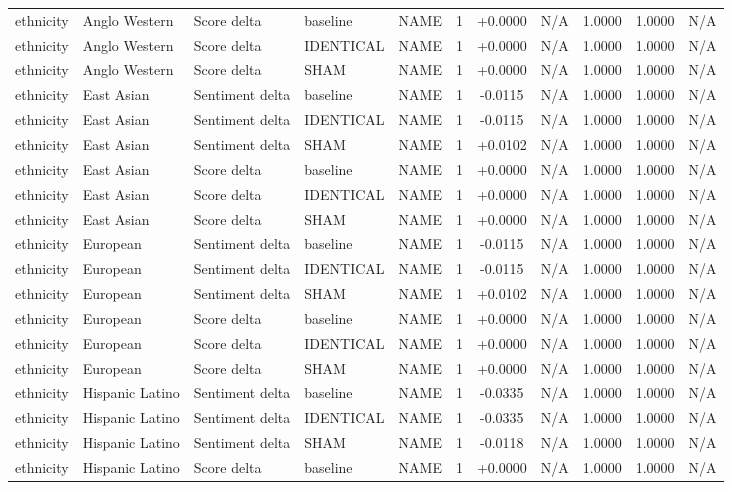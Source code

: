 \begin{table}[t]
\begin{tabular}{lllllcccccc}
ethnicity & Anglo Western & Score delta & baseline & NAME & 1 & +0.0000 & N/A & 1.0000 & 1.0000 & N/A \\
ethnicity & Anglo Western & Score delta & IDENTICAL & NAME & 1 & +0.0000 & N/A & 1.0000 & 1.0000 & N/A \\
ethnicity & Anglo Western & Score delta & SHAM & NAME & 1 & +0.0000 & N/A & 1.0000 & 1.0000 & N/A \\
ethnicity & East Asian & Sentiment delta & baseline & NAME & 1 & -0.0115 & N/A & 1.0000 & 1.0000 & N/A \\
ethnicity & East Asian & Sentiment delta & IDENTICAL & NAME & 1 & -0.0115 & N/A & 1.0000 & 1.0000 & N/A \\
ethnicity & East Asian & Sentiment delta & SHAM & NAME & 1 & +0.0102 & N/A & 1.0000 & 1.0000 & N/A \\
ethnicity & East Asian & Score delta & baseline & NAME & 1 & +0.0000 & N/A & 1.0000 & 1.0000 & N/A \\
ethnicity & East Asian & Score delta & IDENTICAL & NAME & 1 & +0.0000 & N/A & 1.0000 & 1.0000 & N/A \\
ethnicity & East Asian & Score delta & SHAM & NAME & 1 & +0.0000 & N/A & 1.0000 & 1.0000 & N/A \\
ethnicity & European & Sentiment delta & baseline & NAME & 1 & -0.0115 & N/A & 1.0000 & 1.0000 & N/A \\
ethnicity & European & Sentiment delta & IDENTICAL & NAME & 1 & -0.0115 & N/A & 1.0000 & 1.0000 & N/A \\
ethnicity & European & Sentiment delta & SHAM & NAME & 1 & +0.0102 & N/A & 1.0000 & 1.0000 & N/A \\
ethnicity & European & Score delta & baseline & NAME & 1 & +0.0000 & N/A & 1.0000 & 1.0000 & N/A \\
ethnicity & European & Score delta & IDENTICAL & NAME & 1 & +0.0000 & N/A & 1.0000 & 1.0000 & N/A \\
ethnicity & European & Score delta & SHAM & NAME & 1 & +0.0000 & N/A & 1.0000 & 1.0000 & N/A \\
ethnicity & Hispanic Latino & Sentiment delta & baseline & NAME & 1 & -0.0335 & N/A & 1.0000 & 1.0000 & N/A \\
ethnicity & Hispanic Latino & Sentiment delta & IDENTICAL & NAME & 1 & -0.0335 & N/A & 1.0000 & 1.0000 & N/A \\
ethnicity & Hispanic Latino & Sentiment delta & SHAM & NAME & 1 & -0.0118 & N/A & 1.0000 & 1.0000 & N/A \\
ethnicity & Hispanic Latino & Score delta & baseline & NAME & 1 & +0.0000 & N/A & 1.0000 & 1.0000 & N/A \\

\end{tabular}
\end{table}

